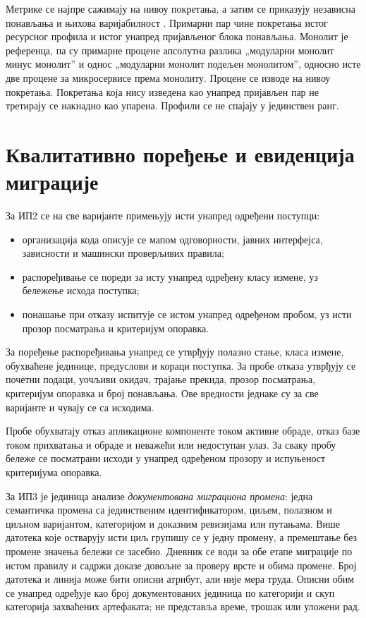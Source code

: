 \documentclass[12pt,oneside]{memoir}
\begin{document}
Метрике се најпре сажимају на нивоу покретања, а затим се приказују независна
понављања и њихова варијабилност \cite{jain1991art,kounev2020benchmarking,
	georges2007statistically}. Примарни пар чине покретања истог ресурсног профила
и истог унапред пријављеног блока понављања. Монолит је референца, па су
примарне процене апсолутна разлика „модуларни монолит минус монолит” и однос
„модуларни монолит подељен монолитом”, односно исте две процене за
микросервисе према монолиту. Процене се изводе на нивоу покретања. Покретања
која нису изведена као унапред пријављен пар не третирају се накнадно као
упарена. Профили се не спајају у јединствен ранг.

\section{Квалитативно поређење и евиденција миграције}

За ИП2 се на све варијанте примењују исти унапред одређени поступци:
\begin{itemize}
	\item организација кода описује се мапом одговорности, јавних интерфејса,
	      зависности и машински проверљивих правила;
	\item распоређивање се пореди за исту унапред одређену класу измене, уз
	      бележење исхода поступка;
	\item понашање при отказу испитује се истом унапред одређеном пробом, уз
	      исти прозор посматрања и критеријум опоравка.
\end{itemize}

За поређење распоређивања унапред се утврђују полазно стање, класа измене,
обухваћене јединице, предуслови и кораци поступка. За пробе отказа утврђују се
почетни подаци, уочљиви окидач, трајање прекида, прозор посматрања, критеријум
опоравка и број понављања. Ове вредности једнаке су за све варијанте и чувају
се са исходима.

Пробе обухватају отказ апликационе компоненте током активне обраде, отказ базе
током прихватања и обраде и неважећи или недоступан улаз. За сваку пробу
бележе се посматрани исходи у унапред одређеном прозору и испуњеност
критеријума опоравка.


За ИП3 је јединица анализе \emph{документована миграциона промена}: једна
семантичка промена са јединственим идентификатором, циљем, полазном и циљном
варијантом, категоријом и доказним ревизијама или путањама. Више датотека које
остварују исти циљ групишу се у једну промену, а премештање без промене значења
бележи се засебно. Дневник се води за обе етапе миграције по истом правилу и
садржи доказе довољне за проверу врсте и обима промене. Број датотека и линија
може бити описни атрибут, али није мера труда. Описни обим се унапред одређује
као број документованих јединица по категорији и скуп категорија захваћених
артефаката; не представља време, трошак или уложени рад.
\end{document}
